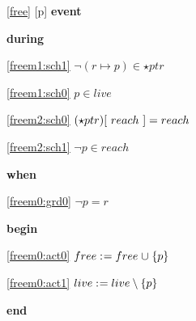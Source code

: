 \noindent \ref{free} [p] \textbf{event}
\begin{block}
  \item   \textbf{during}
  \begin{block}
  \item[ \eqref{freem1:sch1} ]\sout{$\neg (r \mapsto p) \in \star{ptr}$} %
  \end{block}
  \begin{block}
  \item[ \eqref{freem1:sch0} ]{$p \in live$} %
  \item[ \eqref{freem2:sch0} ]{$(\star{ptr})[~reach~] = reach $} %
  \item[ \eqref{freem2:sch1} ]{$\neg p \in reach $} %
  \end{block}
  \item   \textbf{when}
  \begin{block}
  \item[ \eqref{freem0:grd0} ]{$\neg p = r $} %
  \end{block}
  \item   \textbf{begin}
  \begin{block}
  \item[ \eqref{freem0:act0} ]{$free \mathrel{:\mkern1mu=} free \mathbin{\mkern1mu\cup\mkern1mu} \{ p \} $} %
  \item[ \eqref{freem0:act1} ]{$live \mathrel{:\mkern1mu=} live \setminus \{ p \} $} %
  \end{block}
  \item   \textbf{end} \\
\end{block}
